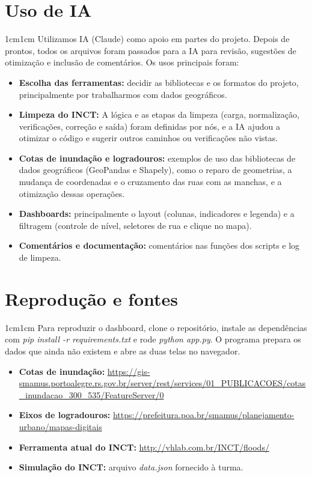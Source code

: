 \documentclass[12pt,a4paper]{article}
\newcommand{\paragrafo}[1]{%
    \begin{adjustwidth}{1cm}{1cm}
        \indent\indent #1
    \end{adjustwidth}
}
\begin{document}
\section{Uso de IA}
    \paragrafo{Utilizamos IA (Claude) como apoio em partes do projeto. Depois de prontos, todos os arquivos foram passados para a IA para revisão, sugestões de otimização e inclusão de comentários. Os usos principais foram:}
    \begin{itemize}
        \item \textbf{Escolha das ferramentas:} decidir as bibliotecas e os formatos do projeto, principalmente por trabalharmos com dados geográficos.
        \item \textbf{Limpeza do INCT:} A lógica e as etapas da limpeza (carga, normalização, verificações, correção e saída) foram definidas por nós, e a IA ajudou a otimizar o código e sugerir outros caminhos ou verificações não vistas.
        \item \textbf{Cotas de inundação e logradouros:} exemplos de uso das bibliotecas de dados geográficos (GeoPandas e Shapely), como o reparo de geometrias, a mudança de coordenadas e o cruzamento das ruas com as manchas, e a otimização dessas operações.
        \item \textbf{Dashboards:} principalmente o layout (colunas, indicadores e legenda) e a filtragem (controle de nível, seletores de rua e clique no mapa).
        \item \textbf{Comentários e documentação:} comentários nas funções dos scripts e log de limpeza.
    \end{itemize}

\section{Reprodução e fontes}
    \paragrafo{Para reproduzir o dashboard, clone o repositório, instale as dependências com \textit{pip install -r requirements.txt} e rode \textit{python app.py}. O programa prepara os dados que ainda não existem e abre as duas telas no navegador.}
    \begin{itemize}
        \item \textbf{Cotas de inundação:} \url{https://gis-smamus.portoalegre.rs.gov.br/server/rest/services/01_PUBLICACOES/cotas_inundacao_300_535/FeatureServer/0}
        \item \textbf{Eixos de logradouros:} \url{https://prefeitura.poa.br/smamus/planejamento-urbano/mapas-digitais}
        \item \textbf{Ferramenta atual do INCT:} \url{http://vhlab.com.br/INCT/floods/}
        \item \textbf{Simulação do INCT:} arquivo \textit{data.json} fornecido à turma.
    \end{itemize}
\end{document}
